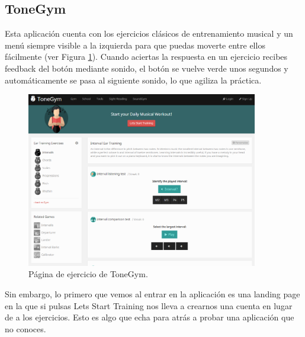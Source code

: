 \documentclass[12pt,twoside,titlepage]{report}
\begin{document}
\subsection{ToneGym}
\label{sec:ToneGym}

Esta aplicación cuenta con los ejercicios clásicos de entrenamiento musical y un menú siempre visible a la izquierda para que puedas moverte entre ellos fácilmente (ver Figura \ref{fig:ToneGym}). Cuando aciertas la respuesta en un ejercicio recibes feedback del botón mediante sonido, el botón se vuelve verde unos segundos y automáticamente se pasa al siguiente sonido, lo que agiliza la práctica.
\cite{tonegym1}

\begin{figure}[H] 
    \includegraphics[width=0.9\textwidth]{Estado del Arte/tonegym}
    \centering
    \caption{Página de ejercicio de ToneGym.}
    \label{fig:ToneGym}
\end{figure}

Sin embargo, lo primero que vemos al entrar en la aplicación es una landing page en la que si pulsas Lets Start Training nos lleva a crearnos una cuenta en lugar de a los ejercicios. Esto es algo que echa para atrás a probar una aplicación que no conoces. 
\cite{tonegym2}
\end{document}
